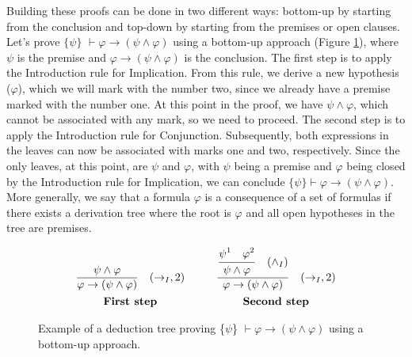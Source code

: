 Building these proofs can be done in two different ways: bottom-up by starting from the conclusion and top-down by starting from the premises or open clauses. Let’s prove \(\{\psi\}\) \(\vdash \varphi \to (\psi \land \varphi)\) using a bottom-up approach (Figure \ref{tab:proof-tree-part}), where \(\psi\) is the premise and \(\varphi \to (\psi \land \varphi)\) is the conclusion. The first step is to apply the Introduction rule for Implication. From this rule, we derive a new hypothesis (\(\varphi\)), which we will mark with the number two, since we already have a premise marked with the number one. At this point in the proof, we have \(\psi \land \varphi\), which cannot be associated with any mark, so we need to proceed. The second step is to apply the Introduction rule for Conjunction. Subsequently, both expressions in the leaves can now be associated with marks one and two, respectively. Since the only leaves, at this point, are \(\psi\) and \(\varphi\), with \(\psi\) being a premise and \(\varphi\) being closed by the Introduction rule for Implication, we can conclude \(\{\psi\} \vdash \varphi \to (\psi \land \varphi)\). More generally, we say that a formula \(\varphi\) is a consequence of a set of formulas if there exists a derivation tree where the root is \(\varphi\) and all open hypotheses in the tree are premises.

\begin{figure}[h!]
    \[
    \begin{array}{c@{\hspace{1cm}}c}
            \frac{\displaystyle \psi \land \varphi\strut}{\displaystyle \varphi \to (\psi \land \varphi)\strut} \quad (\to_I, 2) &
            \frac{\displaystyle\frac{\displaystyle \psi^1 \quad \varphi^2\strut}{\displaystyle \psi \land \varphi\strut}\quad (\land_I)\strut}{\displaystyle \varphi \to (\psi \land \varphi)\strut} \quad (\to_I, 2)\\[10pt]
            \textbf{First step} & \textbf{Second step} \\
    \end{array}
      \]
    \caption{Example of a deduction tree proving \{\(\psi\)\} \( \vdash \varphi \to (\psi \land \varphi) \) using a bottom-up approach.}
    \label{tab:proof-tree-part}
\end{figure}

